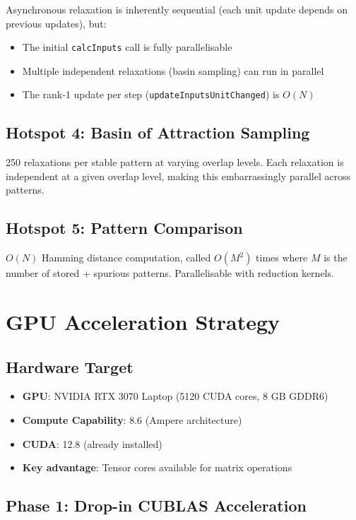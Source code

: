 \documentclass[11pt,a4paper]{article}
\begin{document}
Asynchronous relaxation is inherently sequential (each unit update depends on previous updates), but:
\begin{itemize}
    \item The initial \texttt{calcInputs} call is fully parallelisable
    \item Multiple independent relaxations (basin sampling) can run in parallel
    \item The rank-1 update per step (\texttt{updateInputsUnitChanged}) is $O(N)$
\end{itemize}

\subsection{Hotspot 4: Basin of Attraction Sampling}

250 relaxations per stable pattern at varying overlap levels. Each relaxation is independent at a given overlap level, making this embarrassingly parallel across patterns.

\subsection{Hotspot 5: Pattern Comparison}

$O(N)$ Hamming distance computation, called $O(M^2)$ times where $M$ is the number of stored + spurious patterns. Parallelisable with reduction kernels.

\section{GPU Acceleration Strategy}

\subsection{Hardware Target}

\begin{itemize}
    \item \textbf{GPU}: NVIDIA RTX 3070 Laptop (5120 CUDA cores, 8 GB GDDR6)
    \item \textbf{Compute Capability}: 8.6 (Ampere architecture)
    \item \textbf{CUDA}: 12.8 (already installed)
    \item \textbf{Key advantage}: Tensor cores available for matrix operations
\end{itemize}

\subsection{Phase 1: Drop-in CUBLAS Acceleration}
\end{document}
